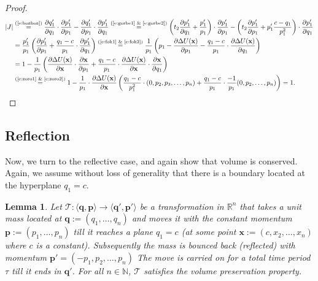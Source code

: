 \documentclass{article} %
\newtheorem{lemma}{Lemma}
\newcommand{\tuple}[1] {\langle #1 \rangle}
\newcommand{\bvec}[1]{\textbf{#1}}
\begin{document}
\begin{proof}
\begin{align*}\label{e:zarrafe1}
|J|
&\overset{\text{(\ref{e:bozboz})}}
=
\frac{\partial q'_1}{\partial q_1} \cdot \frac{\partial p'_1}{\partial p_1}
-
\frac{\partial q'_1}{\partial p_1} \cdot \frac{\partial p'_1}{\partial q_1}
\overset{\text{(\ref{e:gorbe1} \& \ref{e:gorbe2})}}
=
\left(
t_2 \frac{\partial p'_1}{\partial q_1}
+
\frac{p'_1}{p_1}
\right)
\cdot 
\frac{\partial p'_1}{\partial p_1}
-
\left(
t_2 \frac{\partial p'_1}{\partial p_1}
+
p'_1 \frac{c-q_1}{p_1^2}
\right)
\cdot \frac{\partial p'_1}{\partial q_1}\\
&= 
\frac{p'_1}{p_1} 
\left(
\frac{\partial p'_1}{\partial p_1} 
+
\frac{q_1 - c}{p_1} 
\cdot
\frac{\partial p'_1}{\partial q_1}
\right)
\overset{\text{(\ref{e:fok1} \& \ref{e:fok2})}}
=
\frac{1}{p_1} 
\left(
p_1 -
\frac{\partial \Delta U(\bvec{x})}{\partial p_1}%
-
\frac{q_1 - c}{p_1} 
\cdot
\frac{\partial{\Delta U(\bvec{x})}}{\partial q_1}%
\right)
\\
&=
1 - 
\frac{1}{p_1} 
\left(
\frac{\partial \Delta U(\bvec{x})}{\partial \bvec{x}}
\cdot
\frac{\partial \bvec{x}}{\partial p_1}%
+
\frac{q_1 - c}{p_1} 
\cdot
\frac{\partial{\Delta U(\bvec{x})}}
{\partial \bvec{x}}
\cdot
\frac{\partial \bvec{x}}
{\partial q_1}%
\right)
\\
&\overset{\text{(\ref{e:zoro1} \& \ref{e:zoro2})}}
=
1 - 
\frac{1}{p_1} \cdot
\frac{\partial \Delta U(\bvec{x})}{\partial \bvec{x}} 
\left(
\frac{q_1 - c}{p_1^2}
\cdot
(0, p_2, p_3, \ldots, p_n)
+
\frac{q_1 - c}{p_1} 
\cdot
\frac{-1}{p_1}(0, p_2, \ldots, p_n)
\right)
= 1.
\end{align*}
\end{proof}    




\subsection{Reflection}

Now, we turn to the reflective case, and again show that volume is conserved.  Again, we assume without loss of generality that there is a boundary located at the hyperplane $q_1=c$.



\begin{lemma} 
\label{lemma2}
Let $\mathcal{T}: \tuple{\bvec{q}, \bvec{p}} \rightarrow \tuple{\bvec{q}', \bvec{p}'}$ be a transformation in $\mathbb{R}^n$
that takes a unit mass located at $\bvec{q} := (q_1, \ldots, q_n)$ and moves it with the constant momentum $\bvec{p} := (p_1, \ldots, p_n)$ till it reaches a plane $q_1 = c$ (at some point $\bvec{x} := (c, x_2, \ldots, x_n)$ where 
$c$ is a constant).
Subsequently the mass is bounced back (reflected) with momentum  
$
\bvec{p}' = \left( -p_1, p_2, \ldots, p_n \right)
$
The move is carried on for a total time period $\tau$ till it ends in $\bvec{q}'$. 
For all $n \in \mathbb{N}$, $\mathcal{T}$ satisfies the volume preservation property.
\end{lemma}
\end{document}
